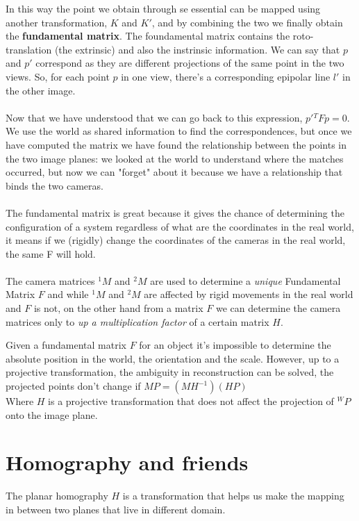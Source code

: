 In this way the point we obtain through se essential can be mapped using another transformation, \(K\) and \(K'\), and by combining the two we finally obtain the \textbf{fundamental matrix}. The foundamental matrix contains the roto-translation (the extrinsic) and also the instrinsic information. We can say that \(p\) and \(p'\) correspond as they are different projections of the same point in the two views. So, for each point \(p\) in one view, there's a corresponding epipolar
line \(l'\) in the other image.
\\
\\
Now that we have understood that we can go back to this expression, \(p' {}^TFp=0\). We use the world as shared information to find the correspondences, but once we have computed the matrix we have found the relationship between the points in the two image planes: we looked at the world to understand where the matches occurred, but now we can "forget" about it because we have a relationship that binds the two cameras.
\\
\\
The fundamental matrix is great because it gives the chance of determining the configuration of a system regardless of what are the coordinates in the real world, it means if we (rigidly) change the coordinates of the cameras in the real world, the same F will hold.
\\
\\
The camera matrices \({}^1M\) and \({}^2M\) are used to determine a \textit{unique} Fundamental Matrix \(F\) and while \({}^1M\) and \({}^2M\) are affected by rigid movements in the real world and \(F\) is not, on the other hand from a matrix \(F\) we can determine the camera matrices only to \textit{up a multiplication factor} of a certain matrix \(H\).

Given a fundamental matrix \(F\) for an object it's impossible to determine the absolute position in the world, the orientation and the scale. 
However, up to a projective transformation, the ambiguity in reconstruction can be solved, the projected points don't change if
\(
    MP = (MH^{-1})(HP)    
\)
\\
Where \(H\) is a projective transformation that does not affect the projection of \({}^WP\) onto the image plane.

\section{Homography and friends}

The planar homography \(H\) is a transformation that helps us make the mapping in between two planes that live in different domain. 

